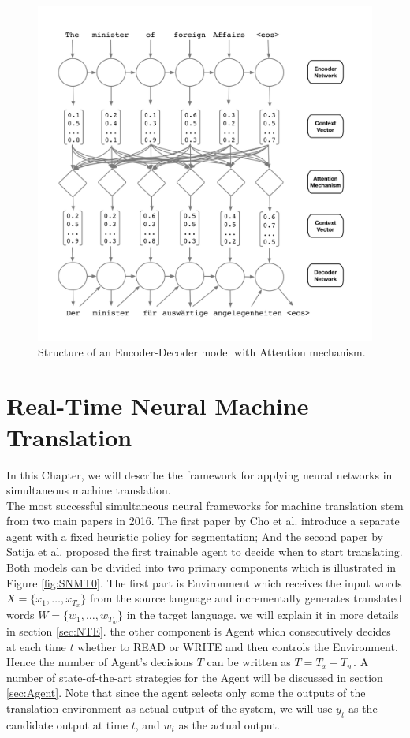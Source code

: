 \documentclass{sfuthesis}
\begin{document}
\begin{figure}[t]
\centering
\includegraphics[scale=0.15]{./images/attention}
\caption{Structure of an Encoder-Decoder model with Attention mechanism.}
\label{fig:EncDec0}
\end{figure}


\chapter{Real-Time Neural Machine Translation} \label{chap:SNMT}
In this Chapter, we will describe the framework for applying neural networks in simultaneous machine translation.\\
The most successful simultaneous neural frameworks for machine translation stem from two main papers in 2016. The first paper by Cho et al. \cite{cho:2016:Arxive} introduce a separate agent with a fixed heuristic policy for segmentation; And the second paper by Satija et al. \cite{harsh:2016:ICML} proposed the first trainable agent to decide when to start translating. Both models can be divided into two primary components which is illustrated in Figure \ref{fig:SNMT0}. The first part is Environment which receives the input words $X=\{x_1, \dots, x_{T_x}\}$ from the source language and incrementally generates translated words $W = \{ w_1, \dots, w_{T_w} \}$ in the target language. we will explain it in more details in section \ref{sec:NTE}. the other component is Agent which consecutively decides at each time $t$ whether to READ or WRITE and then controls the Environment. Hence the number of Agent's decisions $T$ can be written as $T = T_x + T_w$. A number of state-of-the-art strategies for the Agent will be discussed in section \ref{sec:Agent}. Note that since the agent selects only some the outputs of the translation environment as actual output of the system, we will use $y_t$ as the candidate output at time $t$, and $w_i$ as the actual output.
\end{document}
